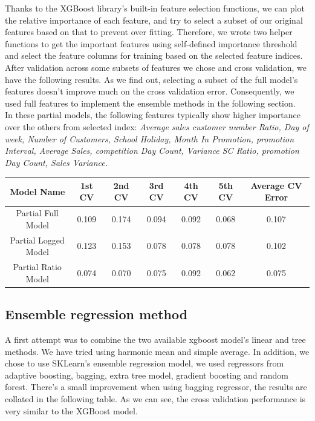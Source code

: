 \documentclass{article}
\begin{document}
Thanks to the XGBoost library's built-in feature selection functions, we can plot the relative importance of each feature, and try to select a subset of our original features based on that to prevent over fitting. Therefore, we wrote two helper functions to get the important features using self-defined importance threshold and select the feature columns for training based on the selected feature indices. After validation across some subsets of features we chose and cross validation, we have the following results. As we find out, selecting a subset of the full model's features doesn't improve much on the cross validation error. Consequently, we used full features to implement the ensemble methods in the following section.\\

In these partial models, the following features typically show higher importance over the others from selected index: \textit{Average sales customer number Ratio, Day of week, Number of Customers, School Holiday, Month In Promotion, promotion Interval, Average Sales, competition Day Count, Variance SC Ratio, promotion Day Count, Sales Variance.}

\begin{center}
 \begin{tabular}{||c c c c c c c||} 
 \hline
 Model Name & 1st CV & 2nd CV & 3rd CV & 4th CV & 5th CV & Average CV Error \\ [0.5ex] 
 \hline\hline
 Partial Full Model & 0.109 & 0.174 & 0.094 & 0.092 & 0.068 & 0.107 \\ 
 \hline
 Partial Logged Model & 0.123 & 0.153 & 0.078 & 0.078 & 0.078 & 0.102 \\ 
 \hline
 Partial Ratio Model & 0.074 & 0.070 & 0.075 & 0.092 & 0.062 & 0.075 \\ [1ex] 
 \hline
\end{tabular}
\end{center}


\subsection{Ensemble regression method}
A first attempt was to combine the two available xgboost model's linear and tree methods. We have tried using harmonic mean and simple average. In addition, we chose to use SKLearn's ensemble regression model, we used regressors from adaptive boosting, bagging, extra tree model, gradient boosting and random forest. There's a small improvement when using bagging regressor, the results are collated in the following table. As we can see, the cross validation performance is very similar to the XGBoost model.\\
\end{document}
